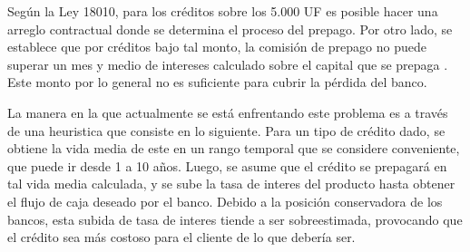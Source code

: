 \qquad Según la Ley 18010, para los créditos sobre los 5.000 UF  es posible hacer una arreglo contractual donde se determina el proceso del prepago. Por otro lado, se establece que por créditos bajo tal monto, la comisión de prepago no puede superar un mes y medio de intereses calculado sobre el capital que se prepaga \cite{valdes}. Este monto por lo general no es suficiente para cubrir la pérdida del banco.

\qquad La manera en la que actualmente se está enfrentando este problema es a través de una heuristica que consiste en lo siguiente. Para un tipo de crédito dado, se obtiene la vida media de este en un rango temporal que se considere conveniente, que puede ir desde 1 a 10 años. Luego, se asume que el crédito se prepagará en tal vida media calculada, y se sube la tasa de interes del producto hasta obtener el flujo de caja deseado por el banco. Debido a la posición conservadora de los bancos, esta subida de tasa de interes tiende a ser sobreestimada, provocando que el crédito sea más costoso para el cliente de lo que debería ser.